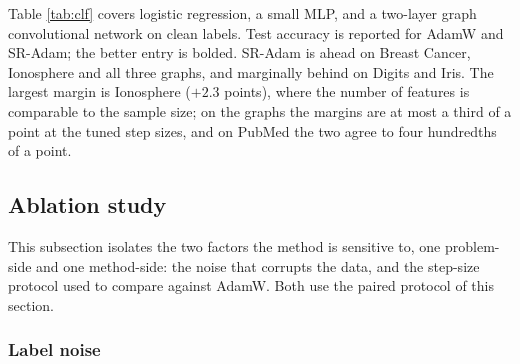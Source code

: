 \documentclass[a4paper,fleqn]{cas-dc}
\theoremstyle{plain}
\theoremstyle{definition}
\theoremstyle{remark}
\begin{document}
Table \ref{tab:clf} covers logistic regression, a small MLP, and a two-layer graph convolutional network \citep{kipf2017} on clean labels. Test accuracy is reported for AdamW and SR-Adam; the better entry is bolded. SR-Adam is ahead on Breast Cancer, Ionosphere and all three graphs, and marginally behind on Digits and Iris. The largest margin is Ionosphere ($+2.3$ points), where the number of features is comparable to the sample size; on the graphs the margins are at most a third of a point at the tuned step sizes, and on PubMed the two agree to four hundredths of a point.

\begin{table}%
\centering
\caption{Classification test accuracy (per cent), clean training labels. Models: logistic regression, one-hidden-layer MLP, and GCN \citep{kipf2017}. Bold $=$ higher accuracy.}
\label{tab:clf}

\end{table}

\subsection{Ablation study}
This subsection isolates the two factors the method is sensitive to, one problem-side and one method-side: the noise that corrupts the data, and the step-size protocol used to compare against AdamW. Both use the paired protocol of this section.
\subsubsection{Label noise}
\end{document}
